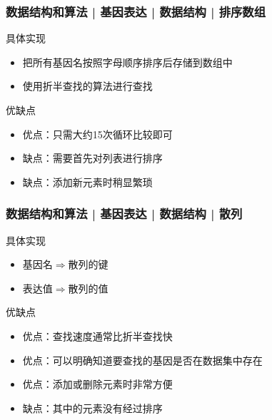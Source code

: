 \begin{frame}
  \frametitle{数据结构和算法 | 基因表达 | 数据结构 | 排序数组}
  \begin{block}{具体实现}
    \begin{itemize}
      \item 把所有基因名按照字母顺序排序后存储到数组中
      \item 使用折半查找的算法进行查找
    \end{itemize}
  \end{block}
  \pause
  \begin{block}{优缺点}
    \begin{itemize}
      \item 优点：只需大约15次循环比较即可
      \item 缺点：需要首先对列表进行排序
      \item 缺点：添加新元素时稍显繁琐
    \end{itemize}
  \end{block}
\end{frame}

\begin{frame}
  \frametitle{数据结构和算法 | 基因表达 | 数据结构 | 散列}
  \begin{block}{具体实现}
    \begin{itemize}
      \item 基因名$\Rightarrow$散列的键
      \item 表达值$\Rightarrow$散列的值
    \end{itemize}
  \end{block}
  \pause
  \begin{block}{优缺点}
    \begin{itemize}
      \item 优点：查找速度通常比折半查找快
      \item 优点：可以明确知道要查找的基因是否在数据集中存在
      \item 优点：添加或删除元素时非常方便
      \item 缺点：其中的元素没有经过排序
    \end{itemize}
  \end{block}
\end{frame}

